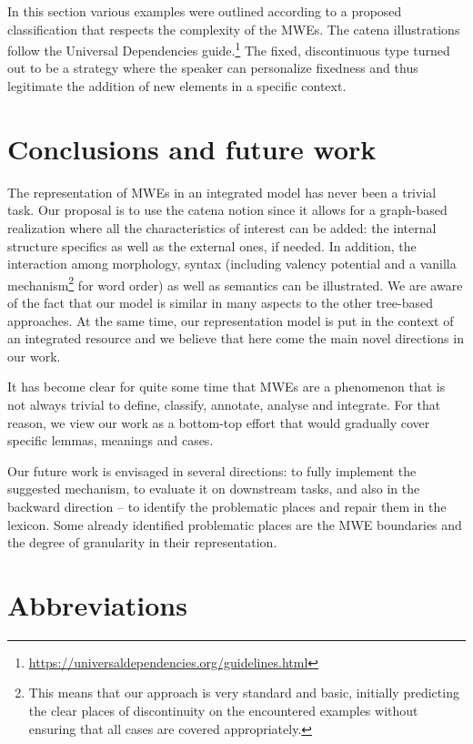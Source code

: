 \documentclass[output=paper,colorlinks,citecolor=brown]{langscibook}
\begin{document}
In this section various examples were outlined according to a proposed classification that respects the complexity of the MWEs. The catena illustrations follow the Universal Dependencies guide.\footnote{\url{https://universaldependencies.org/guidelines.html}} The fixed, discontinuous type turned out to be a strategy where the speaker can personalize fixedness and thus legitimate the addition of new elements in a specific context.

\section{Conclusions and future work}
\label{ConclusionsAndFWOS}

The representation of MWEs in an integrated model has never been a trivial task. Our proposal is to use the catena notion since it allows for a graph-based realization where all the characteristics of interest can be added: the internal structure specifics as well as the external ones, if needed. In addition, the interaction among morphology, syntax (including valency potential and a vanilla mechanism\footnote{This means that our approach is very standard and basic, initially predicting the clear places of discontinuity on the encountered examples without ensuring that all cases are covered appropriately.} for word order) as well as semantics can be illustrated. We are aware of the fact that our model is similar in many aspects to the other tree-based approaches. At the same time, our representation model is put in the context of an integrated resource and we believe that here come the main novel directions in our work.

It has become clear for quite some time that MWEs are a phenomenon that is not always trivial to define, classify, annotate, analyse and integrate. For that reason, we view our work as a bottom-top effort that would gradually cover specific lemmas, meanings and cases.\largerpage

Our future work is envisaged in several directions: to fully implement the suggested mechanism, to evaluate it on downstream tasks, and also in the backward direction -- to identify the problematic places and repair them in the lexicon. Some already identified problematic places are the MWE boundaries and the degree of granularity in their representation.

\section*{Abbreviations}
\end{document}
